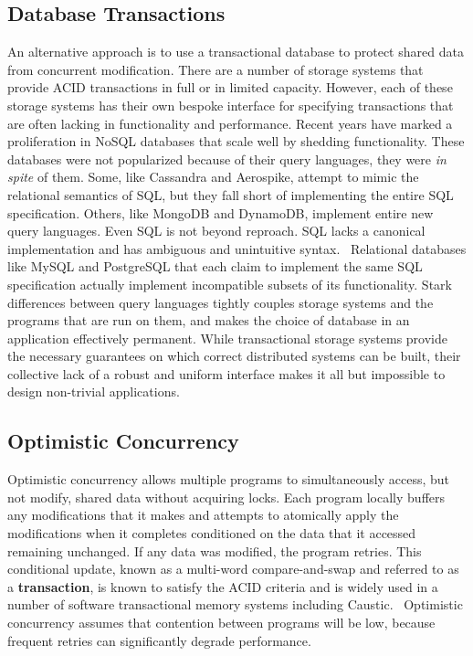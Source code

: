 \documentclass[../main.tex]{subfiles}
\begin{document}
  \subsection{Database Transactions}
  An alternative approach is to use a transactional database to protect shared data from concurrent
  modification. There are a number of storage systems that provide ACID transactions in full or in
  limited capacity. However, each of these storage systems has their own bespoke interface for
  specifying transactions that are often lacking in functionality and performance. Recent years have
  marked a proliferation in NoSQL databases that scale well by shedding functionality. These
  databases were not popularized because of their query languages, they were \emph{in spite} of
  them. Some, like Cassandra and Aerospike, attempt to mimic the relational semantics of SQL, but
  they fall short of implementing the entire SQL specification. Others, like MongoDB and DynamoDB,
  implement entire new query languages. Even SQL is not beyond reproach. SQL lacks a canonical
  implementation and has ambiguous and unintuitive syntax.~\cite{sql} Relational databases like
  MySQL and PostgreSQL that each claim to implement the same SQL specification actually implement
  incompatible subsets of its functionality. Stark differences between query languages tightly
  couples storage systems and the programs that are run on them, and makes the choice of database
  in an application effectively permanent. While transactional storage systems provide the necessary
  guarantees on which correct distributed systems can be built, their collective lack of a robust
  and uniform interface makes it all but impossible to design non-trivial applications.

  \subsection{Optimistic Concurrency}
  Optimistic concurrency allows multiple programs to simultaneously access, but not modify, shared
  data without acquiring locks. Each program locally buffers any modifications that it makes and
  attempts to atomically apply the modifications when it completes conditioned on the data that it
  accessed remaining unchanged. If any data was modified, the program retries. This conditional
  update, known as a multi-word compare-and-swap and referred to as a \textbf{transaction}, is known
  to satisfy the ACID criteria and is widely used in a number of software transactional memory
  systems including Caustic.~\cite{stm} Optimistic concurrency assumes that contention between
  programs will be low, because frequent retries can significantly degrade performance.
\end{document}
